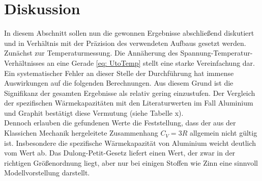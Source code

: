 \section{Diskussion}
In diesem Abschnitt sollen nun die gewonnen Ergebnisse abschließend diskutiert und in
Verhältnis mit der Präzision des verwendeten Aufbaus gesetzt werden. \\
Zunächst zur Temperaturmessung. Die Annäherung des Spannung-Temperatur-Verhältnisses
an eine Gerade \eqref{eq: UtoTemp} stellt eine starke Vereinfachung dar. Ein systematischer
Fehler an dieser Stelle der Durchführung hat immense Auswirkungen auf die folgenden Berechnungen.
Aus diesem Grund ist die Signifikanz der gesamten Ergebnisse als relativ gering einzustufen.
Der Vergleich der spezifischen Wärmekapazitäten mit den Literaturwerten im Fall Aluminium und Graphit bestätigt diese Vermutung (siehe
Tabelle x). \\ %
Dennoch erlauben die gefundenen Werte die Feststellung, dass der aus der Klassichen Mechanik hergeleitete Zusammenhang $C_V = 3R$ allgemein %
nicht gültig ist. Insbesondere die spezifische Wärmekapazität von Aluminium weicht deutlich vom Wert ab. Das Dulong-Petit-Gesetz liefert %
einen Wert, der zwar in der richtigen Größenordnung liegt, aber nur bei einigen Stoffen wie Zinn eine sinnvoll Modellvorstellung darstellt.
